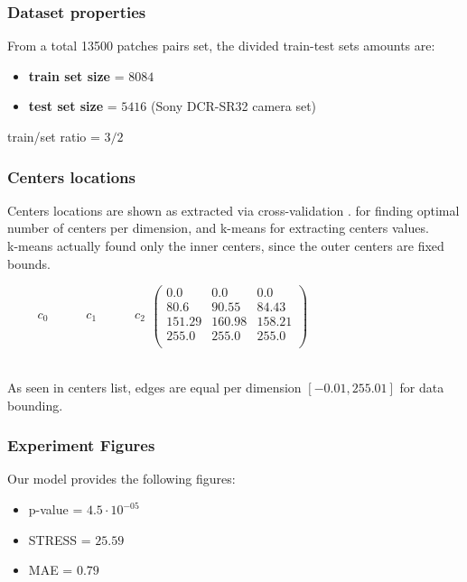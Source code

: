 	\subsubsection{Dataset properties}
	
		From a total 13500 patches pairs set, the divided train-test sets amounts are:
		\begin{itemize}
			\item \textbf{train set size} = $8084$ 
			\item \textbf{test set size} = $5416$ (Sony DCR-SR32 camera set)
		\end{itemize}
		
		train/set ratio = $3/2$

	\subsubsection{Centers locations}
	
	Centers locations are shown as extracted via cross-validation \cite{cross_val}. for finding optimal number of centers per dimension, and k-means for extracting centers values. \\
	k-means actually found only the inner centers, since the outer centers are fixed bounds.


	$
	\begin{matrix}  \qquad  c_0 \quad  \qquad c_1 \quad  \qquad c_2 \end{matrix}
			
	
		\begin{pmatrix}
		0.0 &     0.0 &    0.0\\
		80.6 &   90.55 &    84.43 \\
		151.29 &   160.98 &   158.21\\
		255.0 &  255.0 &   255.0 \\
		\end{pmatrix}$\\
$ $
	

	As seen in centers list, edges are equal per dimension $[-0.01 , 255.01]$ for data bounding.\\
	
	\subsubsection{Experiment Figures}	
	Our model provides the following figures:	
	\begin{itemize}
	\item 	p-value = $4.5 \cdot 10 ^{-05}$
	\item 	STRESS = $25.59$
	\item 	MAE = $0.79$
	
	\end{itemize}


